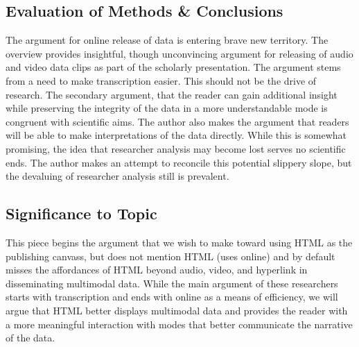 \documentclass[leavefloats]{apa6e}\usepackage[]{graphicx}\usepackage[]{color}
\begin{document}
\subsection{Evaluation of Methods \& Conclusions} %
The argument for online release of data is entering brave new territory.  The overview provides insightful, though unconvincing argument for releasing of audio and video data clips as part of the scholarly presentation.  The argument stems from a need to make transcription easier.  This should not be the drive of research.  The secondary argument, that the reader can gain additional insight while preserving the integrity of the data in a more understandable mode is congruent with scientific aims.  The author also makes the argument that readers will be able to make interpretations of the data directly.  While this is somewhat promising, the idea that researcher analysis may become lost serves no scientific ends.  The author makes an attempt to reconcile this potential slippery slope, but the devaluing of researcher analysis still is prevalent.

\subsection{Significance to Topic} %
This piece begins the argument that we wish to make toward using HTML as the publishing canvass, but does not mention HTML (uses online) and by default misses the affordances of HTML beyond audio, video, and hyperlink in disseminating multimodal data.  While the main argument of these researchers starts with transcription and ends with online as a means of efficiency, we will argue that HTML better displays multimodal data and provides the reader with a more meaningful interaction with modes that better communicate the narrative of the data.


 \section{\textcite{Lie1999}}





\regpar
\end{document}
